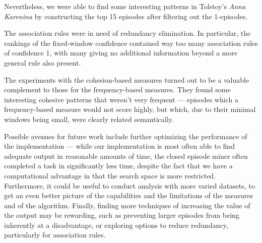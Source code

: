 Nevertheless, we were able to find some interesting patterns in Tolstoy's \emph{Anna Karenina} by constructing the top 15 episodes after filtering out the 1-episodes.

The association rules were in need of redundancy elimination. In particular, the rankings of the fixed-window confidence contained way too many association rules of confidence 1, with many giving no additional information beyond a more general rule also present.

The experiments with the cohesion-based measures turned out to be a valuable complement to those for the frequency-based measures. They found some interesting cohesive patterns that weren't very frequent --- episodes which a frequency-based measure would not score highly, but which, due to their minimal windows being small, were clearly related semantically.

Possible avenues for future work include further optimizing the performance of the implementation --- while our implementation is most often able to find adequate output in reasonable amounts of time, the closed episode miner often completed a task in significantly less time, despite the fact that we have a computational advantage in that the search space is more restricted. Furthermore, it could be useful to conduct analysis with more varied datasets, to get an even better picture of the capabilities and the limitations of the measures and of the algorithm. Finally, finding more techniques of increasing the value of the output may be rewarding, such as preventing larger episodes from being inherently at a disadvantage, or exploring options to reduce redundancy, particularly for association rules.
